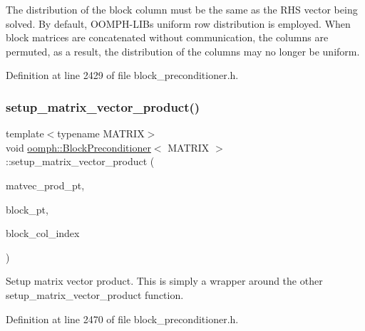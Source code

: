The distribution of the block column must be the same as the R\+HS vector being solved. By default, O\+O\+M\+P\+H-\/\+L\+IB\textquotesingle{}s uniform row distribution is employed. When block matrices are concatenated without communication, the columns are permuted, as a result, the distribution of the columns may no longer be uniform. 

Definition at line 2429 of file block\+\_\+preconditioner.\+h.

\mbox{\label{classoomph_1_1BlockPreconditioner_a65059c036724814a0e490716fa6eaf0a}} 
\subsubsection{\texorpdfstring{setup\+\_\+matrix\+\_\+vector\+\_\+product()}{setup\_matrix\_vector\_product()}\hspace{0.1cm}{\footnotesize\ttfamily [2/2]}}
{\footnotesize\ttfamily template$<$typename M\+A\+T\+R\+IX$>$ \\
void \hyperlink{classoomph_1_1BlockPreconditioner}{oomph\+::\+Block\+Preconditioner}$<$ M\+A\+T\+R\+IX $>$\+::setup\+\_\+matrix\+\_\+vector\+\_\+product (\begin{DoxyParamCaption}\item[{\hyperlink{classoomph_1_1MatrixVectorProduct}{Matrix\+Vector\+Product} $\ast$}]{matvec\+\_\+prod\+\_\+pt,  }\item[{\hyperlink{classoomph_1_1CRDoubleMatrix}{C\+R\+Double\+Matrix} $\ast$}]{block\+\_\+pt,  }\item[{const unsigned \&}]{block\+\_\+col\+\_\+index }\end{DoxyParamCaption})\hspace{0.3cm}{\ttfamily [inline]}}



Setup matrix vector product. This is simply a wrapper around the other setup\+\_\+matrix\+\_\+vector\+\_\+product function. 



Definition at line 2470 of file block\+\_\+preconditioner.\+h.

\mbox{\label{classoomph_1_1BlockPreconditioner_ab8e2478caa8370dd12462f17e1cc8082}} 

